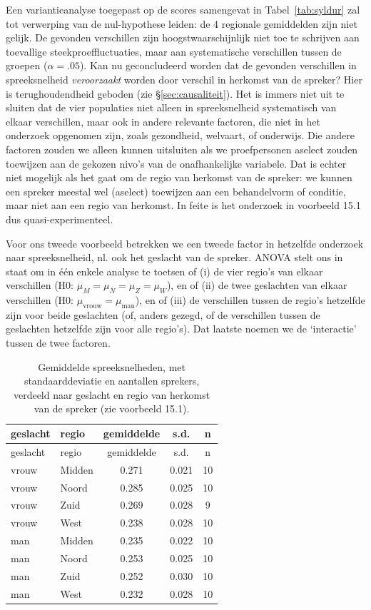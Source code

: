 \documentclass[
]{book}
\begin{document}
Een variantieanalyse toegepast op de scores samengevat in
Tabel~\ref{tab:syldur}
zal tot verwerping van de nul-hypothese leiden: de 4 regionale
gemiddelden zijn niet gelijk. De gevonden verschillen zijn
hoogstwaarschijnlijk niet toe te schrijven aan toevallige
steekproeffluctuaties, maar aan systematische verschillen tussen de
groepen (\(\alpha=.05\)). Kan nu geconcludeerd worden dat de gevonden
verschillen in spreeksnelheid \emph{veroorzaakt} worden door verschil in
herkomst van de spreker? Hier is terughoudendheid geboden (zie
§\ref{sec:causaliteit}). Het is immers niet uit te sluiten dat de
vier populaties niet alleen in spreeksnelheid systematisch van elkaar
verschillen, maar ook in andere relevante factoren, die niet in het
onderzoek opgenomen zijn, zoals gezondheid, welvaart, of onderwijs. Die
andere factoren zouden we alleen kunnen uitsluiten als we proefpersonen
aselect zouden toewijzen aan de gekozen nivo's van de onafhankelijke
variabele. Dat is echter niet mogelijk als het gaat om de regio van
herkomst van de spreker: we kunnen een spreker meestal wel (aselect)
toewijzen aan een behandelvorm of conditie, maar niet aan een regio van
herkomst. In feite is het onderzoek in voorbeeld 15.1
dus quasi-experimenteel.

Voor ons tweede voorbeeld betrekken we een tweede factor in hetzelfde
onderzoek naar spreeksnelheid, nl. ook het geslacht van de spreker.
ANOVA stelt ons in staat om in één enkele analyse te toetsen of (i) de vier
regio's van elkaar verschillen (H0: \(\mu_M = \mu_N = \mu_Z = \mu_W\)), en
of (ii) de twee geslachten van elkaar verschillen (H0:
\(\mu_\textrm{vrouw} = \mu_\textrm{man}\)), en of (iii) de verschillen
tussen de regio's hetzelfde zijn voor beide geslachten (of, anders
gezegd, of de verschillen tussen de geslachten hetzelfde zijn voor alle
regio's). Dat laatste noemen we de `interactie' tussen de twee factoren.

\begin{longtable}[]{@{}llccc@{}}
\caption{\label{tab:syldur2way} Gemiddelde spreeksnelheden, met standaarddeviatie en aantallen sprekers, verdeeld naar geslacht en regio van herkomst van de spreker (zie voorbeeld 15.1).}\tabularnewline
\toprule
geslacht & regio & gemiddelde & s.d. & n\tabularnewline
\midrule
\endfirsthead
\toprule
geslacht & regio & gemiddelde & s.d. & n\tabularnewline
\midrule
\endhead
vrouw & Midden & 0.271 & 0.021 & 10\tabularnewline
vrouw & Noord & 0.285 & 0.025 & 10\tabularnewline
vrouw & Zuid & 0.269 & 0.028 & 9\tabularnewline
vrouw & West & 0.238 & 0.028 & 10\tabularnewline
man & Midden & 0.235 & 0.022 & 10\tabularnewline
man & Noord & 0.253 & 0.025 & 10\tabularnewline
man & Zuid & 0.252 & 0.030 & 10\tabularnewline
man & West & 0.232 & 0.028 & 10\tabularnewline
\bottomrule
\end{longtable}
\end{document}
